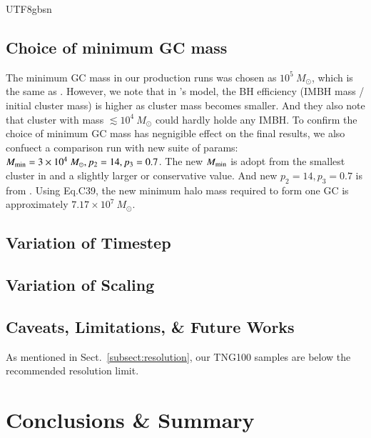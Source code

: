 \documentclass[trackchanges, twocolappendix, twocolumn]{aastex701}
\begin{document}
\begin{CJK*}{UTF8}{gbsn}
\subsection{Choice of minimum GC mass} \label{subsect:Mmin}

The minimum GC mass in our production runs was chosen as $10^5~M_\odot$, which is the same as \cite{Chen&Gnedin2022GC}. However, we note that in \cite{Rantala+2026FROST}'s model, the BH efficiency (IMBH mass / initial cluster mass) is higher as cluster mass becomes smaller. And they also note that cluster with mass $\lesssim 10^4~M_\odot$ could hardly holde any IMBH. To confirm the choice of minimum GC mass has negnigible effect on the final results, we also confuect a comparison run with new suite of params: $M_{\rm min} = 3 \times 10^4~M_\odot, p_2 = 14, p_3 = 0.7$. The new $M_{\rm min}$ is adopt from the smallest cluster in \cite{Vergara+2026IMBH, Rantala+2025FROST} and a slightly larger or conservative value. And new $p_2 = 14, p_3 = 0.7$ is from \cite{Chen&Gnedin2023GC}. Using Eq.C39, the new minimum halo mass required to form one GC
is approximately $7.17 \times 10^7~M_\odot$.

\subsection{Variation of Timestep} \label{subsect:timestep}

\subsection{Variation of Scaling} \label{subsect:f_h}

\subsection{Caveats, Limitations, \& Future Works} \label{subsect:limit}

As mentioned in Sect.~\ref{subsect:resolution}, our TNG100 samples are below the recommended resolution limit.

\section{Conclusions \& Summary} \label{sect:summary}


\end{CJK*}
\end{document}
